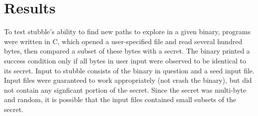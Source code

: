 \documentclass[11pt,expanded,copyright]{fsuthesis}
\begin{document}







\section{Results}

To test stubble's ability to find new paths to explore in a given binary, programs were written in C, which opened a user-specified file and read several hundred bytes, then compared a subset of these bytes with a secret. The binary printed a success condition only if all bytes in user input were observed to be identical to its secret. Input to stubble consists of the binary in question and a seed input file. Input files were guaranteed to work appropriately (not crash the binary), but did not contain any signficant portion of the secret. Since the secret was multi-byte and random, it is possible that the input files contained small subsets of the secret.
\end{document}
